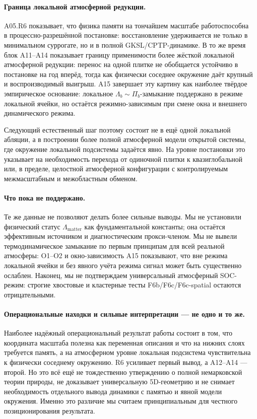 \documentclass[11pt,a4paper]{article}
\theoremstyle{definition}
\theoremstyle{plain}
\theoremstyle{remark}
\begin{document}
\paragraph{Граница локальной атмосферной редукции.}
A05.R6 показывает, что физика памяти на тончайшем масштабе работоспособна в процессно-разрешённой постановке: восстановление удерживается не только в минимальном суррогате, но и в полной GKSL/CPTP-динамике. В то же время блок A11--A14 показывает границу применимости более жёсткой локальной атмосферной редукции: перенос на одной плитке не обобщается устойчиво в постановке на год вперёд, тогда как физически соседнее окружение даёт крупный и воспроизводимый выигрыш. A15 завершает эту картину как наиболее твёрдое эмпирическое основание: локальное $\Lambda_b\sim\Pi_b$-замыкание поддержано в режиме локальной ячейки, но остаётся режимно-зависимым при смене окна и внешнего динамического режима.

Следующий естественный шаг поэтому состоит не в ещё одной локальной абляции, а в построении более полной атмосферной модели открытой системы, где окружение локальной подсистемы задаётся явно. На уровне постановки это указывает на необходимость перехода от одиночной плитки к квазиглобальной или, в пределе, целостной атмосферной конфигурации с контролируемым межмасштабным и межобластным обменом.

\paragraph{Что пока не поддержано.}
Те же данные не позволяют делать более сильные выводы.
Мы не установили физический статус $\Lambda_{\mathrm{matter}}$ как фундаментальной константы;
она остаётся эффективным источником и диагностическим прокси-членом.
Мы не вывели термодинамическое замыкание по первым принципам для всей реальной атмосферы:
O1--O2 и окно-зависимость A15 показывают, что вне режима локальной ячейки и без явного учёта режима
сигнал может быть существенно ослаблен.
Наконец, мы не подтверждаем универсальный атмосферный SOC-режим:
строгие хвостовые и кластерные тесты F6b/F6c/F6c-spatial остаются отрицательными.

\paragraph{Операциональные находки и сильные интерпретации --- не одно и то же.}
Наиболее надёжный операциональный результат работы состоит в том, что координата масштаба полезна как переменная описания
и что на нижних слоях требуется память, а на атмосферном уровне локальная подсистема чувствительна к физически соседнему окружению.
R6 усиливает первый вывод, а A12--A14 --- второй.
Но это всё ещё не тождественно утверждению о полной немарковской теории природы, не доказывает универсальную 5D-геометрию
и не снимает необходимость отдельного вывода динамики с памятью и явной модели окружения.
Именно это различие мы считаем принципиальным для честного позиционирования результата.
\end{document}
